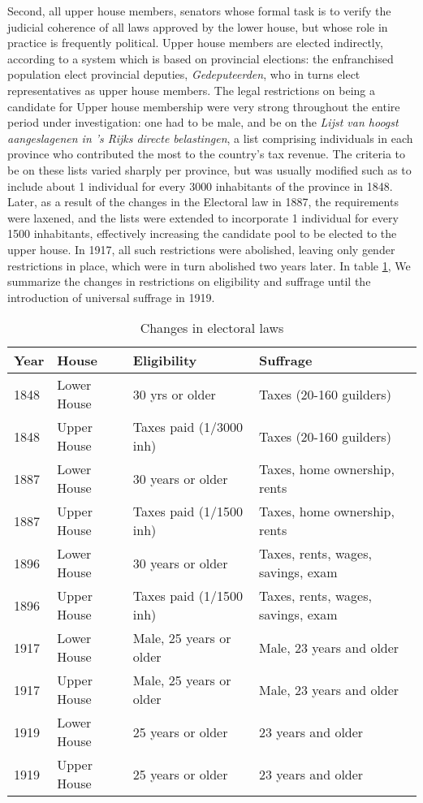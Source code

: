 Second, all upper house members, senators whose formal task is to verify the judicial coherence of all laws approved by the lower house, but whose role in practice is frequently political. Upper house members are elected indirectly, according to a system which is based on provincial elections: the enfranchised population elect provincial deputies, \textit{Gedeputeerden}, who in turns elect representatives as upper house members. The legal restrictions on being a candidate for Upper house membership were very strong throughout the entire period under investigation: one had to be male, and be on the \textit{Lijst van hoogst aangeslagenen in 's Rijks directe belastingen}, a list comprising individuals in each province who contributed the most to the country's tax revenue. The criteria to be on these lists varied sharply per province, but was usually modified such as to include about 1 individual for every 3000 inhabitants of the province in 1848. Later, as a result of the changes in the Electoral law in 1887, the requirements were laxened, and the lists were extended to incorporate 1 individual for every 1500 inhabitants, effectively increasing the candidate pool to be elected to the upper house. In 1917, all such restrictions were abolished, leaving only gender restrictions in place, which were in turn abolished two years later. In table \ref{tab:upperhouselowerhouse}, We summarize the changes in restrictions on eligibility and suffrage until the introduction of universal suffrage in 1919. 

\begin{table}[!ht]
    \footnotesize
    \centering
    \begin{tabular}{llll}
        Year & House & Eligibility & Suffrage  \\ \hline
        1848 & Lower House & 30 yrs or older & Taxes (20-160 guilders) \\
        1848 & Upper House & Taxes paid (1/3000 inh) & Taxes (20-160 guilders) \\
        1887 & Lower House & 30 years or older & Taxes, home ownership, rents \\
        1887 & Upper House & Taxes paid (1/1500 inh) & Taxes, home ownership, rents \\
        1896 & Lower House & 30 years or older & Taxes, rents, wages, savings, exam \\
        1896 & Upper House & Taxes paid (1/1500 inh) & Taxes, rents, wages, savings, exam \\
        1917 & Lower House & Male, 25 years or older & Male, 23 years and older \\
        1917 & Upper House & Male, 25 years or older  & Male, 23 years and older \\
        1919 & Lower House & 25 years or older & 23 years and older \\
        1919 & Upper House & 25 years or older & 23 years and older \\ \hline
    \end{tabular}
    \caption{Changes in electoral laws}
    \label{tab:upperhouselowerhouse}
\end{table}

